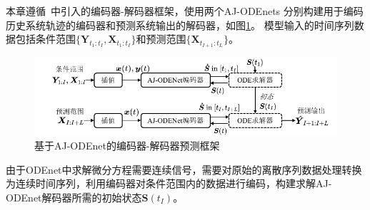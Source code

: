 
本章遵循~\cite{du2020multivariate,yuan2020dual}中引入的编码器-解码器框架，使用两个AJ-ODEnets
分别构建用于编码历史系统轨迹的编码器和预测系统输出的解码器，如图\ref{fig:AJ-ODEnet_framework}。
模型输入的时间序列数据包括条件范围$\{{\boldsymbol{Y}}_{t_{1}:t_{I}}, {\boldsymbol {X}}_{t_{1}:t_{I}}\}$和预测范围$\{{\boldsymbol {X}}_{t_{I+1}:t_{L}}\}$。
\begin{figure}[htb]
    \centering
    \includegraphics[width=1.0\linewidth]{figures/chapter4/Jump-ODEnet_flow.pdf}
     \caption{基于AJ-ODEnet的编码器-解码器预测框架}
    \label{fig:AJ-ODEnet_framework}
\end{figure}

由于ODEnet中求解微分方程需要连续信号，需要对原始的离散序列数据处理转换为连续时间序列，利用编码器对条件范围内的数据进行编码，构建求解AJ-ODEnet解码器所需的初始状态$\boldsymbol S(t_I)$。

